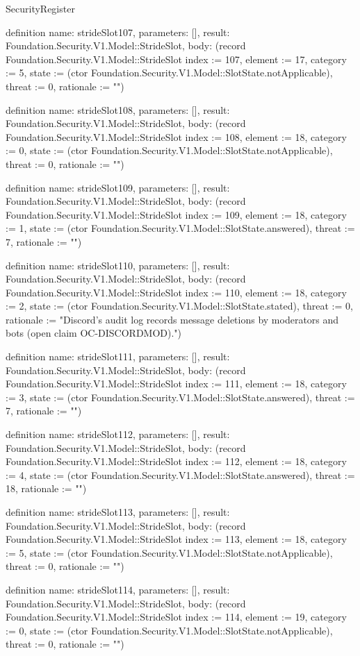 \begin{lexlean}{SecurityRegister}
\begin{semanticmodule}
definition{
  name: strideSlot107,
  parameters: [],
  result: Foundation.Security.V1.Model::StrideSlot,
  body: (record Foundation.Security.V1.Model::StrideSlot {index := 107, element := 17, category := 5, state := (ctor Foundation.Security.V1.Model::SlotState.notApplicable), threat := 0, rationale := ""})
}

definition{
  name: strideSlot108,
  parameters: [],
  result: Foundation.Security.V1.Model::StrideSlot,
  body: (record Foundation.Security.V1.Model::StrideSlot {index := 108, element := 18, category := 0, state := (ctor Foundation.Security.V1.Model::SlotState.notApplicable), threat := 0, rationale := ""})
}

definition{
  name: strideSlot109,
  parameters: [],
  result: Foundation.Security.V1.Model::StrideSlot,
  body: (record Foundation.Security.V1.Model::StrideSlot {index := 109, element := 18, category := 1, state := (ctor Foundation.Security.V1.Model::SlotState.answered), threat := 7, rationale := ""})
}

definition{
  name: strideSlot110,
  parameters: [],
  result: Foundation.Security.V1.Model::StrideSlot,
  body: (record Foundation.Security.V1.Model::StrideSlot {index := 110, element := 18, category := 2, state := (ctor Foundation.Security.V1.Model::SlotState.stated), threat := 0, rationale := "Discord's audit log records message deletions by moderators and bots (open claim OC-DISCORDMOD)."})
}

definition{
  name: strideSlot111,
  parameters: [],
  result: Foundation.Security.V1.Model::StrideSlot,
  body: (record Foundation.Security.V1.Model::StrideSlot {index := 111, element := 18, category := 3, state := (ctor Foundation.Security.V1.Model::SlotState.answered), threat := 7, rationale := ""})
}

definition{
  name: strideSlot112,
  parameters: [],
  result: Foundation.Security.V1.Model::StrideSlot,
  body: (record Foundation.Security.V1.Model::StrideSlot {index := 112, element := 18, category := 4, state := (ctor Foundation.Security.V1.Model::SlotState.answered), threat := 18, rationale := ""})
}

definition{
  name: strideSlot113,
  parameters: [],
  result: Foundation.Security.V1.Model::StrideSlot,
  body: (record Foundation.Security.V1.Model::StrideSlot {index := 113, element := 18, category := 5, state := (ctor Foundation.Security.V1.Model::SlotState.notApplicable), threat := 0, rationale := ""})
}

definition{
  name: strideSlot114,
  parameters: [],
  result: Foundation.Security.V1.Model::StrideSlot,
  body: (record Foundation.Security.V1.Model::StrideSlot {index := 114, element := 19, category := 0, state := (ctor Foundation.Security.V1.Model::SlotState.notApplicable), threat := 0, rationale := ""})
}


\end{semanticmodule}
\end{lexlean}
